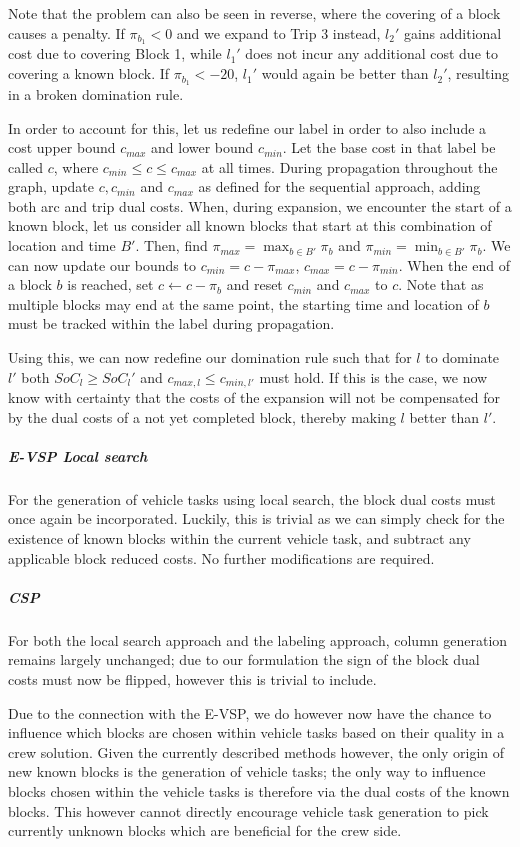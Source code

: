 \documentclass[]{article}
\begin{document}
Note that the problem can also be seen in reverse, where the covering of a block causes a penalty. If $\pi_{b_1} < 0$ and we expand to Trip 3 instead, $l_2'$ gains additional cost due to covering Block 1, while $l_1'$ does not incur any additional cost due to covering a known block. If $\pi_{b_1} < -20$, $l_1'$ would again be better than $l_2'$, resulting in a broken domination rule.  

In order to account for this, let us redefine our label in order to also include a cost upper bound $c_{max}$ and lower bound $c_{min}$. Let the base cost in that label be called $c$, where $c_{min} \leq c \leq c_{max}$ at all times. During propagation throughout the graph, update $c, c_{min}$ and $c_{max}$ as defined for the sequential approach, adding both arc and trip dual costs. When, during expansion, we encounter the start of a known block, let us consider all known blocks that start at this combination of location and time $B'$. Then, find $\pi_{max} = \max_{b \in B'} \pi_{b}$ and $\pi_{min} = \min_{b \in B'} \pi_{b}$. We can now update our bounds to $c_{min} = c - \pi_{max}$, $c_{max} = c - \pi_{min}$. When the end of a block $b$ is reached, set $c \gets c - \pi_b$ and reset $c_{min}$ and $c_{max}$ to $c$. Note that as multiple blocks may end at the same point, the starting time and location of $b$ must be tracked within the label during propagation. 

Using this, we can now redefine our domination rule such that for $l$ to dominate $l'$ both $SoC_l \geq SoC_l'$ and $c_{max,l} \leq c_{min,l'}$ must hold. If this is the case, we now know with certainty that the costs of the expansion will not be compensated for by the dual costs of a not yet completed block, thereby making $l$ better than $l'$.

\subparagraph{E-VSP Local search} For the generation of vehicle tasks using local search, the block dual costs must once again be incorporated. Luckily, this is trivial as we can simply check for the existence of known blocks within the current vehicle task, and subtract any applicable block reduced costs. No further modifications are required.

\subparagraph{CSP} For both the local search approach and the labeling approach, column generation remains largely unchanged; due to our formulation the sign of the block dual costs must now be flipped, however this is trivial to include. 

Due to the connection with the E-VSP, we do however now have the chance to influence which blocks are chosen within vehicle tasks based on their quality in a crew solution. Given the currently described methods however, the only origin of new known blocks is the generation of vehicle tasks; the only way to influence blocks chosen within the vehicle tasks is therefore via the dual costs of the known blocks. This however cannot directly encourage vehicle task generation to pick currently unknown blocks which are beneficial for the crew side. 
\end{document}

